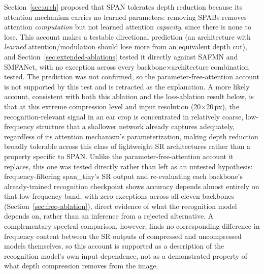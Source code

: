 \documentclass[pdflatex,sn-vancouver-num]{sn-jnl}
\begin{document}
\label{sec:disc-depth}
Section~\ref{sec:arch} proposed that SPAN tolerates depth reduction because its attention mechanism carries no learned parameters: removing SPABs removes attention \emph{computation} but not learned attention \emph{capacity}, since there is none to lose. This account makes a testable directional prediction (an architecture with \emph{learned} attention/modulation should lose more from an equivalent depth cut), and Section~\ref{sec:extended-ablations} tested it directly against SAFMN and SMFANet, with no exception across every backbone$\times$architecture combination tested. The prediction was not confirmed, so the parameter-free-attention account is not supported by this test and is retracted as the explanation. A more likely account, consistent with both this ablation and the loss-ablation result below, is that at this extreme compression level and input resolution (20$\times$20\,px), the recognition-relevant signal in an ear crop is concentrated in relatively coarse, low-frequency structure that a shallower network already captures adequately, regardless of its attention mechanism's parameterization, making depth reduction broadly tolerable across this class of lightweight SR architectures rather than a property specific to SPAN. Unlike the parameter-free-attention account it replaces, this one was tested directly rather than left as an untested hypothesis: frequency-filtering span\_tiny's SR output and re-evaluating each backbone's already-trained recognition checkpoint shows accuracy depends almost entirely on that low-frequency band, with zero exceptions across all eleven backbones (Section~\ref{sec:freq-ablation}), direct evidence of what the recognition model depends on, rather than an inference from a rejected alternative. A complementary spectral comparison, however, finds no corresponding difference in frequency content between the SR outputs of compressed and uncompressed models themselves, so this account is supported as a description of the recognition model's own input dependence, not as a demonstrated property of what depth compression removes from the image.
\end{document}
